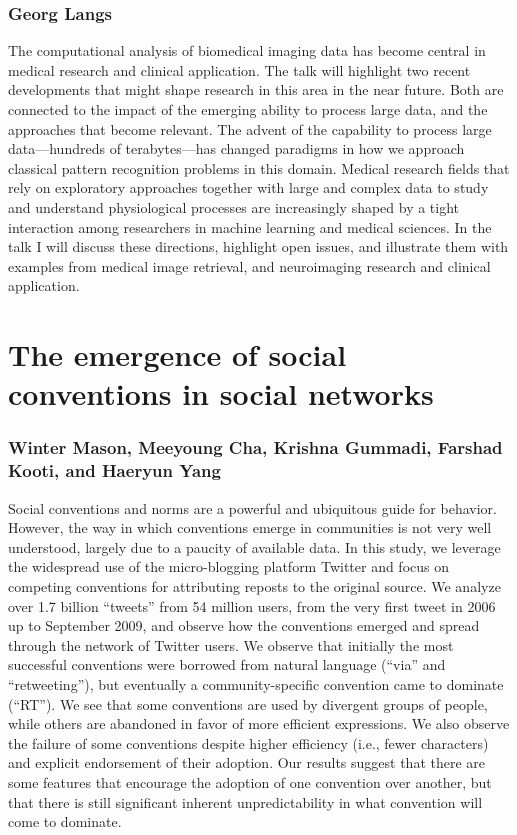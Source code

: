 \documentclass[10pt,letterpaper]{article}
\begin{document}
\subsubsection{Georg Langs}

The computational analysis of biomedical imaging data has become central in
medical research and clinical application. The talk will highlight two recent
developments that might shape research in this area in the near future. Both are
connected to the impact of the emerging ability to process large data, and the
approaches that become relevant. The advent of the capability to process large
data---hundreds of terabytes---has changed paradigms in how we approach classical
pattern recognition problems in this domain. Medical research fields that rely on
exploratory approaches together with large and complex data to study and
understand physiological processes are increasingly shaped by a tight interaction
among researchers in machine learning and medical sciences. In the talk I will
discuss these directions, highlight open issues, and illustrate them
with examples from medical image retrieval, and neuroimaging research and
clinical application.

\section{The emergence of social conventions in social networks}
\subsubsection{Winter Mason, Meeyoung Cha, Krishna Gummadi, Farshad Kooti, and Haeryun Yang}

Social conventions and norms are a powerful and ubiquitous guide for behavior.
However, the way in which conventions emerge in communities is not very well
understood, largely due to a paucity of available data.  In this study, we
leverage the widespread use of the micro-blogging platform Twitter and focus on
competing conventions for attributing reposts to the original source.  We analyze
over 1.7 billion ``tweets'' from 54 million users, from the very first tweet in
2006 up to September 2009, and observe how the conventions emerged and spread
through the network of Twitter users.  We observe that initially the most
successful conventions were borrowed from natural language (``via'' and
``retweeting''), but eventually a community-specific convention came to dominate
(``RT'').  We see that some conventions are used by divergent groups of people,
while others are abandoned in favor of more efficient expressions.  We also
observe the failure of some conventions despite higher efficiency (i.e., fewer
characters) and explicit endorsement of their adoption.  Our results suggest that
there are some features that encourage the adoption of one convention over
another, but that there is still significant inherent unpredictability in what
convention will come to dominate.
\end{document}
